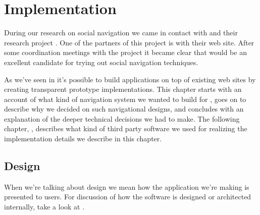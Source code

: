 \chapter{Implementation}
\label{chapter:implementation}

During our research on social navigation we came in contact with
%
and their  research project%
.
One of the partners of this project is %
with their \urort{} web site. After some coordination meetings with the
 project it became clear that \urort{} would be an excellent
candidate for trying out social navigation techniques.

As we've seen in 
it's possible to build applications on top of existing web sites by creating
transparent prototype implementations. This chapter starts with an account of
what kind of navigation system we wanted to build for \urort{}, goes on to
describe why we decided on such navigational designs, and concludes with an
explanation of the deeper technical decisions we had to make. The following
chapter, ,
describes what kind of third party software we used for realizing the
implementation details we describe in this chapter.

\section{Design}
\label{section:implementation.design}

When we're talking about design we mean how the application we're making is
presented to users. For discussion of how the software is designed
or architected internally, take a look at
.


